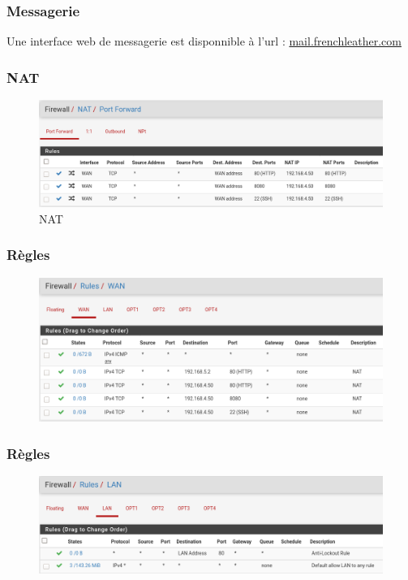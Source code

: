 \documentclass{beamer}
\begin{document}
		\begin{frame}
			\frametitle{Messagerie}
			Une interface web de messagerie est disponnible à l'url : \url{mail.frenchleather.com}
		\end{frame}
		\begin{frame}
			\frametitle{NAT}
			\begin{center}
				\begin{figure}
					\includegraphics[scale=.3]{portforwading.png}
					\caption{NAT}
				\end{figure}
			\end{center}
		\end{frame}
		\begin{frame}
			\frametitle{Règles}
			\begin{center}
				\begin{figure}
					\includegraphics[scale=.3]{rules.png}
					\caption{}
				\end{figure}
			\end{center}
		\end{frame}
		\begin{frame}
			\frametitle{Règles}
			\begin{center}
				\begin{figure}
					\includegraphics[scale=.3]{rules2.png}
					\caption{}
				\end{figure}
			\end{center}
		\end{frame}
\end{document}
